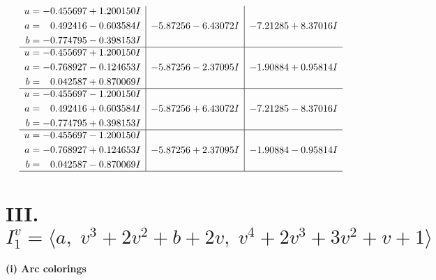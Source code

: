 \documentclass[1p]{elsarticle_modified}
\theoremstyle{definition}
\begin{document}
$$\begin{array}{c|c|c}
\begin{aligned}
u &= -0.455697 + 1.200150 I \\
a &= \phantom{-}0.492416 - 0.603584 I \\
b &= -0.774795 - 0.398153 I\end{aligned}
 & -5.87256 - 6.43072 I & -7.21285 + 8.37016 I \\ \hline\begin{aligned}
u &= -0.455697 + 1.200150 I \\
a &= -0.768927 - 0.124653 I \\
b &= \phantom{-}0.042587 + 0.870069 I\end{aligned}
 & -5.87256 - 2.37095 I & -1.90884 + 0.95814 I \\ \hline\begin{aligned}
u &= -0.455697 - 1.200150 I \\
a &= \phantom{-}0.492416 + 0.603584 I \\
b &= -0.774795 + 0.398153 I\end{aligned}
 & -5.87256 + 6.43072 I & -7.21285 - 8.37016 I \\ \hline\begin{aligned}
u &= -0.455697 - 1.200150 I \\
a &= -0.768927 + 0.124653 I \\
b &= \phantom{-}0.042587 - 0.870069 I\end{aligned}
 & -5.87256 + 2.37095 I & -1.90884 - 0.95814 I\\
 \hline 
 \end{array}$$\newpage\newpage\renewcommand{\arraystretch}{1}
\centering \section*{III. $I^v_{1}= \langle a,\;v^3+2 v^2+b+2 v,\;v^4+2 v^3+3 v^2+v+1 \rangle$}
\flushleft \textbf{(i) Arc colorings}\\
\end{document}
